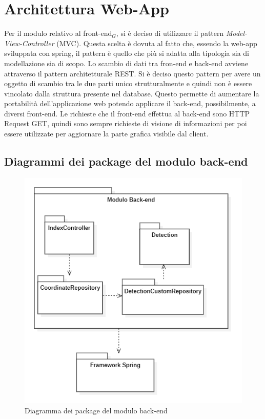 \section{Architettura Web-App}\label{ArchitetturaDelProdottoWebApp}
Per il modulo relativo al front-end$_G$, si è deciso di utilizzare il pattern \textit{Model-View-Controller} (MVC).
Questa scelta è dovuta al fatto che, essendo la web-app sviluppata con spring, il pattern è quello che più si adatta alla tipologia sia di modellazione sia di scopo.
Lo scambio di dati tra fron-end e back-end avviene attraverso il pattern architetturale REST. Si è deciso questo pattern per avere un oggetto di scambio tra le due parti unico strutturalmente e quindi non è essere vincolato dalla struttura presente nel database.
Questo permette di aumentare la portabilità dell'applicazione web potendo applicare il back-end, possibilmente, a diversi front-end. Le richieste che il front-end effettua al back-end sono HTTP Request GET, quindi sono sempre richieste di visione di informazioni per poi essere utilizzate per aggiornare la parte grafica visibile dal client.
\subsection{Diagrammi dei package del modulo back-end}
\begin{center}
	\begin{figure}[H]
		\centering\includegraphics[scale=0.8]{../immagini/diag_PB/diag_pack_spring.png}
		\caption{Diagramma dei package del modulo back-end}
	\end{figure}
\end{center}
